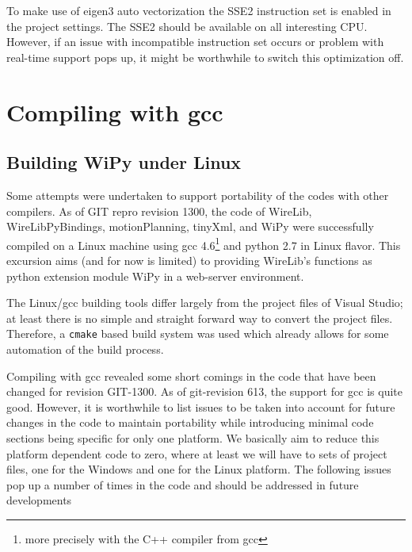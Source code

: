 \documentclass[11pt,a4paper,onepage,openany]{book}
\begin{document}
To make use of eigen3 auto vectorization the SSE2 instruction set is enabled in
the project settings. The SSE2 should be available on all interesting CPU.
However, if an issue with incompatible instruction set occurs or problem with
real-time support pops up, it might be worthwhile to switch this optimization
off.

\section{Compiling with gcc}
\subsection{Building WiPy under Linux}
Some attempts were undertaken to support portability of the codes with other
compilers. As of GIT repro revision 1300, the code of WireLib,
WireLibPyBindings, motionPlanning, tinyXml, and WiPy were successfully compiled
on a Linux machine using
gcc 4.6\footnote{more precisely with the C++ compiler from gcc} and python 2.7
in Linux flavor. This excursion aims (and for now is limited) to providing
WireLib's functions as python extension module WiPy in a web-server environment.

The Linux/gcc building tools differ largely from the project files of Visual
Studio; at least there is no simple and straight forward way to convert the
project files. Therefore, a \texttt{cmake} based build system was
used which already allows for some automation of the build process.

Compiling with gcc revealed some short comings in the code that have been
changed for revision GIT-1300. As of git-revision 613, the support for gcc is
quite good. However, it is worthwhile to list issues to be taken
into account for future changes in the code to maintain portability while
introducing minimal code sections being specific for only one platform. We
basically aim to reduce this platform dependent code to zero, where at least we
will have to sets of project files, one for the Windows and one for the Linux
platform. The following issues pop up a number of times in the code and should
be addressed in future developments
\end{document}
